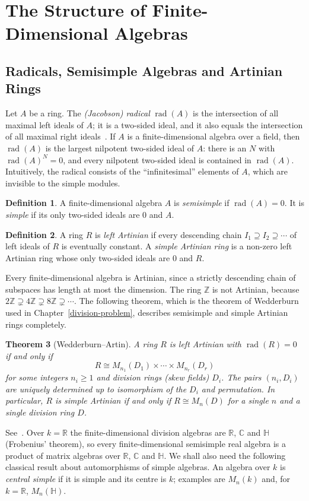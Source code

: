 \documentclass[12pt, a4paper]{report}
\theoremstyle{plain}
\newtheorem{theorem}{Theorem}[chapter]
\theoremstyle{definition}
\newtheorem{definition}[theorem]{Definition}
\theoremstyle{remark}
\theoremstyle{plain}
\newcommand{\rad}[0]{\operatorname{rad}} %
\newcommand{\RR}{\mathbb{R}}
\newcommand{\CC}{\mathbb{C}}
\newcommand{\HH}{\mathbb{H}}
\newcommand{\ZZ}{\mathbb{Z}}
\begin{document}
\section{The Structure of Finite-Dimensional Algebras}
\label{sec:alg-background}

\subsection{Radicals, Semisimple Algebras and Artinian Rings}
\label{subsec:radicals}
Let $A$ be a ring. The \emph{(Jacobson) radical} $\rad(A)$ is the intersection of all maximal left ideals of $A$; it is a two-sided ideal, and it also equals the intersection of all maximal right ideals~\cite[\S4]{Lam2001}. If $A$ is a finite-dimensional algebra over a field, then $\rad(A)$ is the largest nilpotent two-sided ideal of $A$: there is an $N$ with $\rad(A)^N=0$, and every nilpotent two-sided ideal is contained in $\rad(A)$. Intuitively, the radical consists of the ``infinitesimal'' elements of $A$, which are invisible to the simple modules.

\begin{definition}\label{def:semisimple}
A finite-dimensional algebra $A$ is \emph{semisimple} if $\rad(A)=0$. It is \emph{simple} if its only two-sided ideals are $0$ and $A$.
\end{definition}

\begin{definition}\label{def:artinian}
A ring $R$ is \emph{left Artinian} if every descending chain $I_1\supseteq I_2\supseteq\cdots$ of left ideals of $R$ is eventually constant. A \emph{simple Artinian ring} is a non-zero left Artinian ring whose only two-sided ideals are $0$ and $R$.
\end{definition}

Every finite-dimensional algebra is Artinian, since a strictly descending chain of subspaces has length at most the dimension. The ring $\ZZ$ is not Artinian, because $2\ZZ\supsetneq4\ZZ\supsetneq8\ZZ\supsetneq\cdots$. The following theorem, which is the theorem of Wedderburn used in Chapter~\ref{division-problem}, describes semisimple and simple Artinian rings completely.

\begin{theorem}[Wedderburn--Artin]\label{thm:wedderburn-artin}
A ring $R$ is left Artinian with $\rad(R)=0$ if and only if
\[ R\cong M_{n_1}(D_1)\times\cdots\times M_{n_r}(D_r) \]
for some integers $n_i\geq 1$ and division rings (skew fields) $D_i$. The pairs $(n_i,D_i)$ are uniquely determined up to isomorphism of the $D_i$ and permutation. In particular, $R$ is simple Artinian if and only if $R\cong M_n(D)$ for a single $n$ and a single division ring $D$.
\end{theorem}
See~\cite[Theorems~3.5 and~3.10]{Lam2001}. Over $k=\RR$ the finite-dimensional division algebras are $\RR$, $\CC$ and $\HH$ (Frobenius' theorem), so every finite-dimensional semisimple real algebra is a product of matrix algebras over $\RR$, $\CC$ and $\HH$. We shall also need the following classical result about automorphisms of simple algebras. An algebra over $k$ is \emph{central simple} if it is simple and its centre is $k$; examples are $M_n(k)$ and, for $k=\RR$, $M_n(\HH)$.
\end{document}
